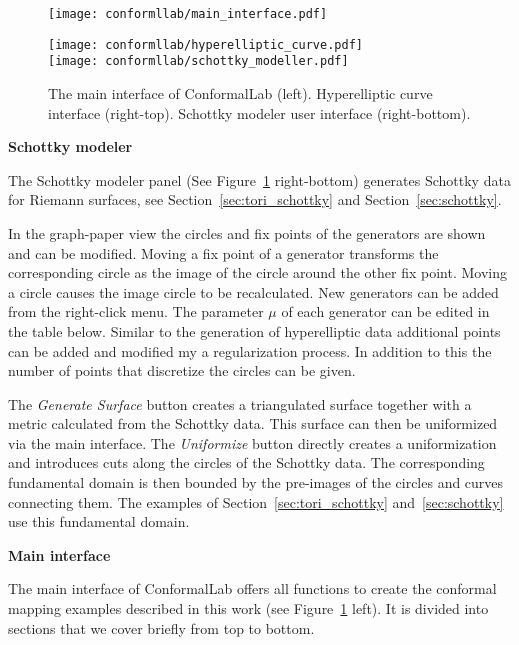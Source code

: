 \documentclass[Thesis.tex]{subfiles}
\begin{document}
\begin{figure}
\centering
\texttt{[image: conformllab/main\_interface.pdf]}\hfill
\begin{minipage}[b]{0.5\linewidth}
\texttt{[image: conformllab/hyperelliptic\_curve.pdf]}\\
\vskip 0.1cm
\texttt{[image: conformllab/schottky\_modeller.pdf]}
\end{minipage}
\caption{The main interface of {\sc ConformalLab} (left). Hyperelliptic curve interface (right-top).
Schottky modeler user interface (right-bottom).}
\label{fig:conformal_main_generators}
\end{figure}

{\bf Schottky modeler}

The Schottky modeler panel (See Figure~\ref{fig:conformal_main_generators} right-bottom) generates Schottky data for Riemann surfaces, see Section~\ref{sec:tori_schottky} and Section~\ref{sec:schottky}. 

In the graph-paper view the circles and fix points of the generators are shown and can be modified. 
Moving a fix point of a generator transforms the corresponding circle as the image of the circle around the other fix point. 
Moving a circle causes the image circle to be recalculated. 
New generators can be added from the right-click menu. 
The parameter $\mu$ of each generator can be edited in the table below.
Similar to the generation of hyperelliptic data additional points can be added and modified my a regularization process. 
In addition to this the number of points that discretize the circles can be given.

The \emph{Generate Surface} button creates a triangulated surface together with a metric calculated from the Schottky data. 
This surface can then be uniformized via the main interface. 
The \emph{Uniformize} button directly creates a uniformization and introduces cuts along the circles of the Schottky data. 
The corresponding fundamental domain is then bounded by the pre-images of the circles and curves connecting them.
The examples of Section~\ref{sec:tori_schottky} and~\ref{sec:schottky} use this fundamental domain.

{\bf Main interface}

The main interface of {\sc ConformalLab} offers all functions to create the conformal mapping examples described in this work (see Figure~\ref{fig:conformal_main_generators} left). 
It is divided into sections that we cover briefly from top to bottom. 
\end{document}
